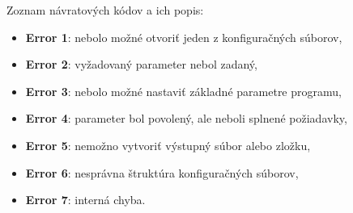 Zoznam návratových kódov a ich popis:

\begin{itemize}
    \item \textbf{Error 1}: nebolo možné otvoriť jeden z konfiguračných súborov,
    \item \textbf{Error 2}: vyžadovaný parameter nebol zadaný,
    \item \textbf{Error 3}: nebolo možné nastaviť základné parametre programu,
    \item \textbf{Error 4}: parameter bol povolený, ale neboli splnené požiadavky,
    \item \textbf{Error 5}: nemožno vytvoriť výstupný súbor alebo zložku,
    \item \textbf{Error 6}: nesprávna štruktúra konfiguračných súborov,
    \item \textbf{Error 7}: interná chyba.
\end{itemize}

